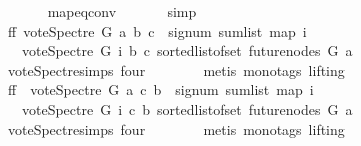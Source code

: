 \begin{isabellebody}
\ \ \ \ \ \isamarkupfalse%
\ map{\isacharunderscore}{\kern0pt}eq{\isacharunderscore}{\kern0pt}conv\isanewline
\ \ \ \ \ \isamarkupfalse%
\ simp\ \isanewline
\ \ \ \ \isamarkupfalse%
\ ff{\isacharcolon}{\kern0pt}\ {\isachardoublequoteopen}vote{\isacharunderscore}{\kern0pt}Spectre\ G\ a\ b\ c\ {\isacharequal}{\kern0pt}\ signum\ {\isacharparenleft}{\kern0pt}sum{\isacharunderscore}{\kern0pt}list\ {\isacharparenleft}{\kern0pt}map\ {\isacharparenleft}{\kern0pt}{\isasymlambda}i{\isachardot}{\kern0pt}\isanewline
\ \ \ {\isacharparenleft}{\kern0pt}vote{\isacharunderscore}{\kern0pt}Spectre\ G\ i\ b\ c{\isacharparenright}{\kern0pt}{\isacharparenright}{\kern0pt}\ {\isacharparenleft}{\kern0pt}sorted{\isacharunderscore}{\kern0pt}list{\isacharunderscore}{\kern0pt}of{\isacharunderscore}{\kern0pt}set\ {\isacharparenleft}{\kern0pt}future{\isacharunderscore}{\kern0pt}nodes\ G\ a{\isacharparenright}{\kern0pt}{\isacharparenright}{\kern0pt}{\isacharparenright}{\kern0pt}{\isacharparenright}{\kern0pt}{\isachardoublequoteclose}\isanewline
\ \ \ \ \ \ \isamarkupfalse%
\ vote{\isacharunderscore}{\kern0pt}Spectre{\isachardot}{\kern0pt}simps\ four\isanewline
\ \ \ \ \ \ \isamarkupfalse%
\ {\isacharparenleft}{\kern0pt}metis\ {\isacharparenleft}{\kern0pt}mono{\isacharunderscore}{\kern0pt}tags{\isacharcomma}{\kern0pt}\ lifting{\isacharparenright}{\kern0pt}{\isacharparenright}{\kern0pt}\ \isanewline
\ \ \ \ \isamarkupfalse%
\ ff{}{\isacharcolon}{\kern0pt}\ \ {\isachardoublequoteopen}vote{\isacharunderscore}{\kern0pt}Spectre\ G\ a\ c\ b\ {\isacharequal}{\kern0pt}\ signum\ {\isacharparenleft}{\kern0pt}sum{\isacharunderscore}{\kern0pt}list\ {\isacharparenleft}{\kern0pt}map\ {\isacharparenleft}{\kern0pt}{\isasymlambda}i{\isachardot}{\kern0pt}\isanewline
\ \ \ {\isacharparenleft}{\kern0pt}vote{\isacharunderscore}{\kern0pt}Spectre\ G\ i\ c\ b{\isacharparenright}{\kern0pt}{\isacharparenright}{\kern0pt}\ {\isacharparenleft}{\kern0pt}sorted{\isacharunderscore}{\kern0pt}list{\isacharunderscore}{\kern0pt}of{\isacharunderscore}{\kern0pt}set\ {\isacharparenleft}{\kern0pt}future{\isacharunderscore}{\kern0pt}nodes\ G\ a{\isacharparenright}{\kern0pt}{\isacharparenright}{\kern0pt}{\isacharparenright}{\kern0pt}{\isacharparenright}{\kern0pt}{\isachardoublequoteclose}\isanewline
\ \ \ \ \ \ \isamarkupfalse%
\ vote{\isacharunderscore}{\kern0pt}Spectre{\isachardot}{\kern0pt}simps\ four\isanewline
\ \ \ \ \ \ \isamarkupfalse%
\ {\isacharparenleft}{\kern0pt}metis\ {\isacharparenleft}{\kern0pt}mono{\isacharunderscore}{\kern0pt}tags{\isacharcomma}{\kern0pt}\ lifting{\isacharparenright}{\kern0pt}{\isacharparenright}{\kern0pt}\isanewline

\end{isabellebody}
